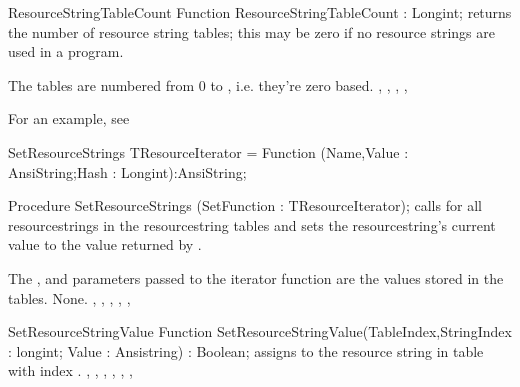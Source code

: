 \begin{function}{ResourceStringTableCount}
\Declaration
Function ResourceStringTableCount : Longint;
\Description
{} returns the number of resource string tables;
this may be zero if no resource strings are used in a program.

The tables are numbered from 0 to , i.e.
they're zero based.
\Errors
\SeeAlso
{},
,
,
,
\end{function}

For an example, see 

\begin{procedure}{SetResourceStrings}
\Declaration
TResourceIterator =  Function (Name,Value : AnsiString;Hash : Longint):AnsiString;

Procedure SetResourceStrings (SetFunction :  TResourceIterator);
\Description
{} calls  for all resourcestrings
in the resourcestring tables and sets the resourcestring's current value
to the value returned by .

The , and  parameters passed to the iterator
function are the values stored in the tables.
\Errors
None.
\SeeAlso
{},
,
,
,
,
\end{procedure}


\begin{function}{SetResourceStringValue}
\Declaration
Function SetResourceStringValue(TableIndex,StringIndex : longint; Value : Ansistring) : Boolean;
\Description
{} assigns  to the resource string in
table  with index .
\Errors
\SeeAlso
{},
,
,
,
,
,
\end{function}



%
%
\printindex
